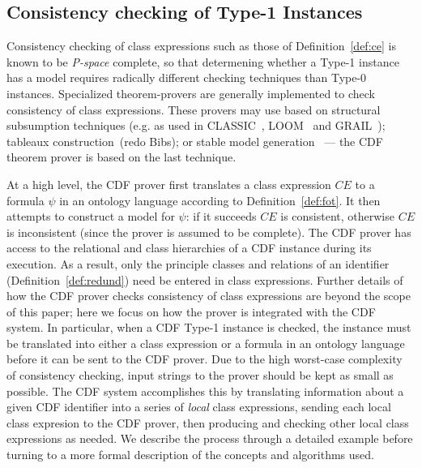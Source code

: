 \subsection{Consistency checking of Type-1 Instances} 
\label{sec:type1consist}

Consistency checking of class expressions such as those of
Definition~\ref{def:ce} is known to be {\em P-space} complete, so that
determening whether a Type-1 instance has a model requires radically
different checking techniques than Type-0 instances.  Specialized
theorem-provers are generally implemented to check consistency of
class expressions.  These provers may use based on structural
subsumption techniques (e.g. as used in CLASSIC~\cite{PMBRB91},
LOOM~\cite{MacB94} and GRAIL~\cite{RBGHNS97}); tableaux
construction~\cite{HoPS99}(redo Bibs); or stable model
generation~\cite{Swif04} --- the CDF theorem prover is based on the
last technique.

At a high level, the CDF prover first translates a class expression
$CE$ to a formula $\psi$ in an ontology language according to
Definition~\ref{def:fot}.  It then attempts to construct a model for
$\psi$: if it succeeds $CE$ is consistent, otherwise $CE$ is
inconsistent (since the prover is assumed to be complete).  The CDF
prover has access to the relational and class hierarchies of a CDF
instance during its execution.  As a result, only the principle
classes and relations of an identifier (Definition~\ref{def:redund})
need be entered in class expressions.  Further details of how the CDF
prover checks consistency of class expressions are beyond the scope of
this paper; here we focus on how the prover is integrated with the CDF
system.  In particular, when a CDF Type-1 instance is checked, the
instance must be translated into either a class expression or a
formula in an ontology language before it can be sent to the CDF
prover.  Due to the high worst-case complexity of consistency
checking, input strings to the prover should be kept as small as
possible.  The CDF system accomplishes this by translating information
about a given CDF identifier into a series of {\em local} class
expressions, sending each local class expresion to the CDF prover,
then producing and checking other local class expressions as needed.
We describe the process through a detailed example before turning to a
more formal description of the concepts and algorithms used.

